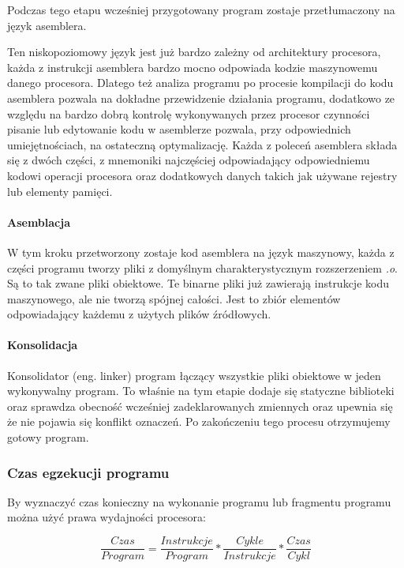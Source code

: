 \documentclass[a4paper,12pt]{article}
\begin{document}
Podczas tego etapu wcześniej przygotowany program zostaje przetłumaczony na język asemblera. 

Ten niskopoziomowy język jest już bardzo zależny od architektury procesora, każda z  instrukcji asemblera bardzo mocno odpowiada kodzie maszynowemu danego procesora. 
Dlatego też analiza programu po procesie kompilacji do kodu asemblera pozwala na dokładne przewidzenie działania programu, dodatkowo
ze względu na bardzo dobrą kontrolę wykonywanych przez procesor czynności pisanie lub edytowanie kodu w asemblerze pozwala, przy odpowiednich umiejętnościach, na ostateczną optymalizację. 
Każda z poleceń asemblera składa się z dwóch części, z mnemoniki najczęściej odpowiadający odpowiedniemu kodowi operacji procesora oraz dodatkowych danych takich jak używane rejestry lub elementy pamięci. 

\paragraph{Asemblacja}

W tym kroku przetworzony zostaje kod asemblera na język maszynowy, każda z części programu tworzy pliki z domyślnym charakterystycznym rozszerzeniem \textit{.o}.
Są to tak zwane pliki obiektowe.
Te binarne pliki już zawierają instrukcje kodu maszynowego, ale nie tworzą spójnej całości. Jest to zbiór elementów odpowiadający każdemu z użytych plików źródłowych.

\paragraph{Konsolidacja}
Konsolidator (eng. linker) program łączący wszystkie pliki obiektowe w jeden wykonywalny program. To właśnie na tym etapie dodaje się statyczne biblioteki oraz sprawdza obecność wcześniej zadeklarowanych zmiennych oraz upewnia się że nie pojawia się konflikt oznaczeń. Po zakończeniu tego procesu otrzymujemy gotowy program. 


\subsubsection{Czas egzekucji programu\cite{arch}}

By wyznaczyć czas konieczny na wykonanie programu lub fragmentu programu można użyć prawa wydajności procesora:

\begin{equation}
        \label{Iron Law}
        \frac{Czas}{Program} =  \frac{Instrukcje}{Program} * \frac{Cykle}{Instrukcje} * \frac{Czas}{Cykl}
\end{equation}
\end{document}
